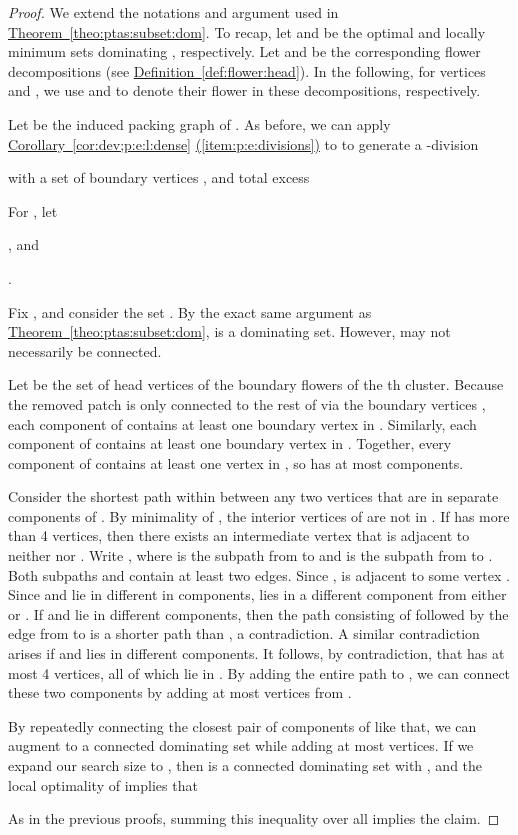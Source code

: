 \documentclass[12pt]{article}
\theoremstyle{remark}\theoremheaderfont{\sf}\theorembodyfont{\upshape}
\numberwithin{figure}{section}\numberwithin{table}{section}\numberwithin{equation}{section}
\newcommand{\HLinkSuffix}[3]{\hyperref[#2]{#1\ref*{#2}{#3}}}
\newcommand{\HLinkShort}[2]{\hyperref[#2]{#1\ref*{#2}}}
\newcommand{\HLink}[2]{\hyperref[#2]{#1~\ref*{#2}}}
\newcommand{\HLinkPage}[2]{\hyperref[#2]{#1~\ref*{#2}}}
\newcommand{\corref}[1]{\HLink{Corollary}{cor:#1}}\newcommand{\correfshort}[1]{\HLinkShort{C}{cor:#1}}\newcommand{\correfpage}[1]{\HLinkPage{Corollary}{cor:#1}}
\newcommand{\defref}[1]{\HLink{Definition}{def:#1}}
\newcommand{\itemref}[1]{\HLinkSuffix{(}{item:#1}{)}}
\newcommand{\thmref}[1]{\HLink{Theorem}{theo:#1}}
\renewcommand{\th}{th\xspace}
\begin{document}
\begin{proof}
  We extend the notations and argument used in
  \thmref{ptas:subset:dom}. To recap, let  and
   be the optimal and locally minimum sets
  dominating , respectively.  Let
   and
   be the corresponding flower
  decompositions (see \defref{flower:head}). In the following, for
  vertices  and , we use
   and  to denote their flower in these
  decompositions, respectively.

  Let  be the
  induced packing graph of . As
  before, we can apply \corref{dev;p:e:l:dense}
  \itemref{p:e:divisions} to  to generate a
  -division
  
  with a set of boundary vertices , and total excess
  
  For , let \smallskip
  \begin{compactenum}[\qquad(i)]
  \item
    

  \item
    , and 

  \item .
  \end{compactenum}Fix , and consider the set
  . By the exact
  same argument as \thmref{ptas:subset:dom},  is a
  dominating set. However,  may not necessarily be
  connected.

  Let  be the set of head vertices
  of the boundary flowers of the \th cluster.  Because the removed
  patch  is only connected to the rest of  via the
  boundary vertices , each component of 
  contains at least one boundary vertex in
  . Similarly, each component of
   contains at least one boundary vertex in
  . Together, every component of  contains at
  least one vertex in , so  has at most
   components.

  Consider the shortest path  within  between any
  two vertices  that are in separate components of
  . By minimality of , the interior vertices of
   are not in .  If  has more than 4
  vertices, then there exists an intermediate vertex 
  that is adjacent to neither  nor .  Write
  , where  is the subpath
  from  to  and  is the subpath from  to . Both
  subpaths  and  contain at least two
  edges. Since ,  is adjacent to some vertex
  . Since  and  lie in different in components,
   lies in a different component from either  or .  If 
  and  lie in different components, then the path consisting of
   followed by the edge from  to  is a shorter path
  than , a contradiction. A similar contradiction arises if
   and  lies in different components. It follows, by
  contradiction, that  has at most 4 vertices, all of which
  lie in .  By adding the entire path  to
  , we can connect these two components by adding at most
   vertices from .


  By repeatedly connecting the closest pair of components of
   like that, we can augment  to a connected
  dominating set  while adding at most
   vertices. If we expand our
  search size to , then  is a
  connected dominating set with
  , and the local
  optimality of  implies that
  
  As in the previous proofs, summing this inequality over all 
  implies the claim.
\end{proof}
\end{document}

